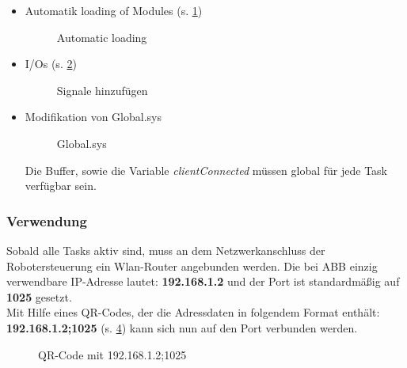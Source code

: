 \begin{itemize}
\item Automatik loading of Modules (s. \ref{fig:autoLoad})
\begin{figure}[H]
	\centering
	\caption[Automatic loading]{Automatic loading}
	\label{fig:autoLoad}
\end{figure}
\item I/Os (s. \ref{fig:signale})
\begin{figure}[H]
	\centering
	\caption[Signale hinzufügen]{Signale hinzufügen}
	\label{fig:signale}
	\end{figure}
\item Modifikation von Global.sys
\begin{figure}[H]
	\centering
	\caption[Global.sys]{Global.sys}
	\label{fig:globalSys}
\end{figure}
Die Buffer, sowie die Variable \textit{clientConnected} müssen global für jede 
Task verfügbar sein.
\end{itemize}  

\subsubsection{Verwendung}
Sobald alle Tasks aktiv sind, muss an dem Netzwerkanschluss der 
Robotersteuerung ein Wlan-Router angebunden werden. Die bei ABB einzig 
verwendbare IP-Adresse lautet: \textbf{192.168.1.2} und der Port ist 
standardmäßig auf \textbf{1025} gesetzt.\\
Mit Hilfe eines QR-Codes, der die Adressdaten in folgendem Format enthält:\\ 
\textbf{192.168.1.2;1025} (s. \ref{fig:qrCode}) kann sich nun auf den Port 
verbunden werden.
\begin{figure}[H]
	\centering
	\caption[QR-Code mit 192.168.1.2;1025]{QR-Code mit 192.168.1.2;1025}
	\label{fig:qrCode}
\end{figure}
